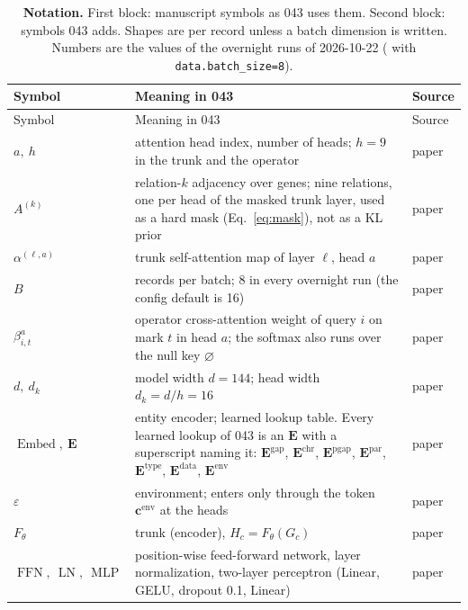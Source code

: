 \begingroup
\footnotesize
\setlength{\tabcolsep}{4pt}
\begin{longtable}{>{\raggedright\arraybackslash}p{34mm}>{\raggedright\arraybackslash}p{128mm}>{\raggedright\arraybackslash}p{10mm}}
\caption[]{\textbf{Notation.} First block: manuscript symbols as 043 uses them. Second
block: symbols 043 adds. Shapes are per record unless a batch dimension is written.
Numbers are the values of the overnight runs of 2026-10-22
( with \texttt{data.batch\_size=8}).}\label{tab:notation}\\
\toprule
Symbol & Meaning in 043 & Source \\
\midrule
\endfirsthead
\toprule
Symbol & Meaning in 043 & Source \\
\midrule
\endhead
$a,\ h$ & attention head index, number of heads; $h = 9$ in the trunk and the operator & paper \\
$A^{(k)}$ & relation-$k$ adjacency over genes; nine relations, one per head of the masked trunk layer, used as a hard mask (Eq.~\ref{eq:mask}), not as a KL prior & paper \\
$\alpha^{(\ell,a)}$ & trunk self-attention map of layer $\ell$, head $a$ & paper \\
$B$ & records per batch; 8 in every overnight run (the config default is 16) & paper \\
$\beta^{a}_{i,t}$ & operator cross-attention weight of query $i$ on mark $t$ in head $a$; the softmax also runs over the null key $\varnothing$ & paper \\
$d,\ d_k$ & model width $d = 144$; head width $d_k = d/h = 16$ & paper \\
$\operatorname{Embed},\ \mathbf{E}$ & entity encoder; learned lookup table. Every learned lookup of 043 is an $\mathbf{E}$ with a superscript naming it: $\mathbf{E}^{\mathrm{gap}}$, $\mathbf{E}^{\mathrm{chr}}$, $\mathbf{E}^{\mathrm{pgap}}$, $\mathbf{E}^{\mathrm{par}}$, $\mathbf{E}^{\mathrm{type}}$, $\mathbf{E}^{\mathrm{data}}$, $\mathbf{E}^{\mathrm{env}}$ & paper \\
$\varepsilon$ & environment; enters only through the token $\mathbf{c}^{\mathrm{env}}$ at the heads & paper \\
$F_\theta$ & trunk (encoder), $H_c = F_\theta(G_c)$ & paper \\
$\operatorname{FFN},\ \operatorname{LN},\ \operatorname{MLP}$ & position-wise feed-forward network, layer normalization, two-layer perceptron (Linear, GELU, dropout 0.1, Linear) & paper \\

\end{longtable}
